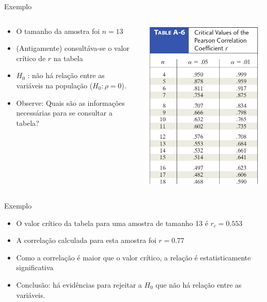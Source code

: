 \documentclass{beamer}
\begin{document}
\begin{frame}{Exemplo}
  \begin{columns}
    \begin{column}{5cm}
      \begin{itemize}
      \item O tamanho da amostra foi $n=13$
      \item (Antigamente) consultáva-se o valor crítico de $r$ na tabela
      \item $H_0$ : não há relação entre as variáveis na população ($H_0: \rho = 0$).
      \item Observe: Quais são as informações necessárias para se consultar a tabela?
      \end{itemize}
    \end{column}
    \begin{column}{5cm}
      \includegraphics[height=0.8\textheight]{Assoc/test}
    \end{column}
  \end{columns}
\end{frame}

\begin{frame}{Exemplo}
  \begin{itemize}
  \item O valor crítico da tabela para uma amostra de tamanho 13 é
    $r_c = 0.553$
  \item A correlação calculada para esta amostra foi $r=0.77$
  \item Como a correlação é maior que o valor crítico, a relação é
    estatisticamente significativa
  \item Conclusão: há evidências para rejeitar a $H_0$ que não há
    relação entre as variáveis.
  \end{itemize}
\end{frame}
\end{document}
